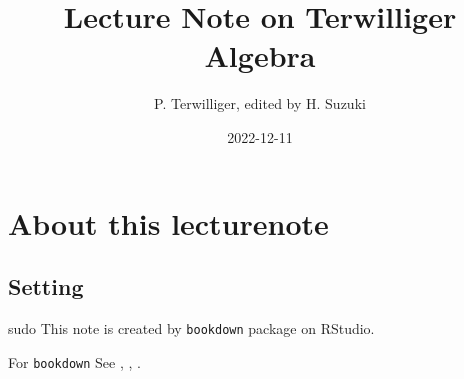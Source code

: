 \documentclass[
]{book}
\title{Lecture Note on Terwilliger Algebra}
\author{P. Terwilliger, edited by H. Suzuki}
\date{2022-12-11}
\theoremstyle{definition}
\theoremstyle{definition}
\theoremstyle{definition}
\theoremstyle{definition}
\theoremstyle{remark}
\begin{document}
\maketitle

{
\setcounter{tocdepth}{1}
\tableofcontents
}
\hypertarget{about-this-lecturenote}{%
\chapter*{About this lecturenote}\label{about-this-lecturenote}}

\hypertarget{setting}{%
\section*{Setting}\label{setting}}

sudo
This note is created by \texttt{bookdown} package on RStudio.

For \texttt{bookdown} See \citep{xie2015}, \citep{xie2017}, \citep{xie2018}.
\end{document}
